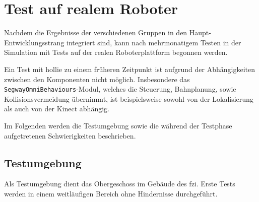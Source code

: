 
\chapter{Test auf realem Roboter}
\authorsection{\editortobias}



Nachdem die Ergebnisse der verschiedenen Gruppen in den Haupt-Entwicklungsstrang integriert sind, kann nach mehrmonatigem Testen in der Simulation mit Tests auf der realen Roboterplattform begonnen werden.

Ein Test mit \gls{hollie} zu einem früheren Zeitpunkt ist aufgrund der Abhängigkeiten zwischen den Komponenten nicht möglich.
Insbesondere das \lstinline{SegwayOmniBehaviours}-Modul, welches die Steuerung, Bahnplanung, sowie Kollisionsvermeidung übernimmt, ist beispielsweise sowohl von der Lokalisierung als auch von der Kinect abhängig.

Im Folgenden werden die Testumgebung sowie die während der Testphase aufgetretenen Schwierigkeiten beschrieben.


\section{Testumgebung}


Als Testumgebung dient das Obergeschoss im Gebäude des \gls{fzi}.
Erste Tests werden in einem weitläufigen Bereich ohne Hindernisse durchgeführt.

